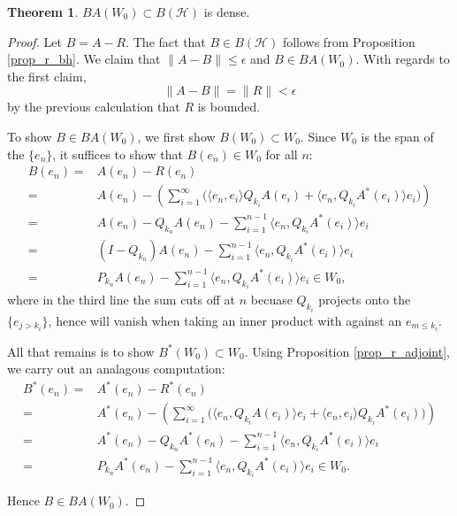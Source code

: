 \documentclass{dcthesis}
\numberwithin{equation}{section}
\numberwithin{equation}{section}
\theoremstyle{definition}
\newtheorem{theorem}[equation]{Theorem}
\begin{document}
\begin{theorem}
	$BA(W_0)\subset B(\mathcal{H})$ is dense.
\end{theorem}
\begin{proof}
	Let $B = A - R$. The fact that $B\in B(\mathcal{H})$ follows from Proposition \ref{prop_r_bh}. We claim that $\|A-B\|\leq \epsilon$ and $B\in BA(W_0)$. With regards to the first claim,
	\begin{equation*}
		\|A-B\|=\|R\| < \epsilon
	\end{equation*}
	by the previous calculation that $R$ is bounded. 

	To show $B\in BA(W_0)$, we first show $B(W_0)\subset W_0$. Since $W_0$ is the span of the $\{e_n\}$, it suffices to show that $B(e_n)\in W_0$ for all $n$:
	\begin{align*}
		B(e_n)
		=& A(e_n) - R(e_n) \\
		=& A(e_n) - \left( \sum_{i=1}^\infty \Big( \langle e_n, e_i \rangle Q_{k_i}A(e_i) + \langle e_n, Q_{k_i}A^\ast(e_i) \rangle e_i \Big) \right) \\
		=& A(e_n) - Q_{k_n}A(e_n) - \sum_{i=1}^{n-1} \langle e_n, Q_{k_i}A^\ast(e_i) \rangle e_i \\
		=& (I-Q_{k_n})A(e_n) - \sum_{i=1}^{n-1} \langle e_n, Q_{k_i}A^\ast(e_i) \rangle e_i \\
		=& P_{k_n}A(e_n) - \sum_{i=1}^{n-1} \langle e_n, Q_{k_i}A^\ast(e_i) \rangle e_i \in W_0,
	\end{align*}
	where  in the third line the sum cuts off at $n$ becuase $Q_{k_i}$ projects onto the $\{e_{j>k_i}\}$, hence will vanish when taking an inner product with against an $e_{m\leq k_i}$.

	All that remains is to show $B^\ast(W_0)\subset W_0$. Using Proposition \ref{prop_r_adjoint}, we carry out an analagous computation:
	\begin{align*}
		B^\ast(e_n)
		=& A^\ast(e_n) - R^\ast(e_n) \\
		=& A^\ast(e_n) - \left(\sum_{i=1}^\infty \big( \langle e_n, Q_{k_i}A(e_i) \rangle e_i + \langle e_n, e_i \rangle Q_{k_i}A^\ast (e_i) \Big)\right) \\
		=& A^\ast(e_n) - Q_{k_n}A^\ast(e_n) - \sum_{i=1}^{n-1}\langle e_n, Q_{k_i}A^\ast(e_i)\rangle e_i \\
		=& P_{k_n}A^\ast(e_n) - \sum_{i=1}^{n-1}\langle e_n, Q_{k_i}A^\ast(e_i)\rangle e_i \in W_0.
	\end{align*}

	Hence $B\in BA(W_0)$.
\end{proof}
\end{document}
